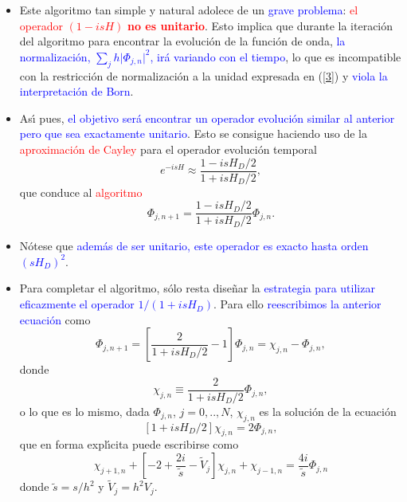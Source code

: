 \documentclass[12pt]{iopart}
\def\az{\textcolor{blue}}
\def\ro{\textcolor{red}}
\begin{document}
\begin{itemize}
\item Este algoritmo tan simple y natural adolece de un \az{grave problema}: \ro{el operador 
$(1-isH)$ {\bf no es unitario}}. Esto implica que durante la iteraci{\'o}n del algoritmo para encontrar la evoluci{\'o}n de la 
funci{\'o}n de onda,  \az{la normalizaci{\'o}n, $\sum_j h \vert\Phi_{j,n}\vert^2$, ir{\'a} variando con el tiempo}, lo que es incompatible
con la restricci\'on de normalizaci\'on a la unidad expresada en (\ref{3}) y \az{viola la interpretaci\'on de Born}.

\item As\'{\i} pues, \az{el objetivo ser{\'a} encontrar un operador evoluci{\'o}n similar al anterior pero que sea exactamente unitario}. Esto
se  consigue haciendo uso de la \ro{aproximaci\'on de Cayley} para el operador evoluci\'on temporal
%
\begin{equation}
e^{-isH}\approx \frac{1-isH_D/2}{1+isH_D/2},
\end{equation}
%
que conduce  al  \ro{algoritmo}
%
\begin{equation}
\Phi_{j,n+1}=\frac{1-isH_D/2}{1+isH_D/2}\Phi_{j,n}.
\end{equation}
%

\item N\'otese que \az{adem{\'a}s de ser unitario, este operador es exacto hasta orden $(sH_D)^2$}.

\item Para completar el algoritmo, s\'olo resta dise{\~n}ar la \az{estrategia para  utilizar eficazmente el operador $1/(1+isH_D)$}.
Para ello \az{reescribimos la anterior ecuaci{\'o}n} como
%
\begin{equation}
\label{evol}
\Phi_{j,n+1}=\left[ \frac{2}{1+isH_D/2} -1 \right]\Phi_{j,n}=\chi_{j,n}-\Phi_{j,n},
\end{equation}
%
donde
%
\begin{equation}
\chi_{j,n}\equiv \frac{2}{1+isH_D/2}\Phi_{j,n},
\end{equation}
%
o lo que es lo mismo, dada $\Phi_{j,n}$, $j=0,..,N$, $\chi_{j,n}$ es la soluci{\'o}n de la ecuaci{\'o}n
%
\begin{equation}
\left[ 1+isH_D/2  \right]\chi_{j,n}=2\Phi_{j,n},
\end{equation}
%
que en forma expl{\'\i}cita puede escribirse como
%
\begin{equation}
\chi_{j+1,n}+\left[-2+\frac{2i}{\tilde s}-\tilde V_j \right]\chi_{j,n}+\chi_{j-1,n}=\frac{4i}{\tilde s}\Phi_{j,n}
\label{kappa}
\end{equation}
%
donde $\tilde s=s/h^2$ y $\tilde V_j=h^2V_j$.


\end{itemize}
\end{document}
